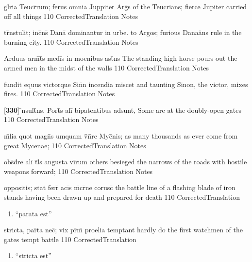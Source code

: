 \latline
  {gl\={}ria Teucr\={}rum; ferus omnia Juppiter Arg\={}s}
  { of the Teucrians; fierce Jupiter carried off all things }
  {110}
  { CorrectedTranslation }
  { Notes }


\latline
  {tr\={}nstulit; inc\={}ns\={} Dana\={\macron {\i}} dominantur in urbe.}
  { to Argos; furious Dana\"ans rule in the burning city.  }
  {110}
  { CorrectedTranslation }
  { Notes }


\latline
  {Arduus arm\={}t\={}s medi\={\macron {\i}}s in moenibus ast\={}ns}
  { The standing high horse pours out the armed men in the midst of the walls }
  {110}
  { CorrectedTranslation }
  { Notes }


\latline
  {fundit equus victorque Sin\={}n incendia miscet}
  { and taunting Sinon, the victor, mixes fires.  }
  {110}
  { CorrectedTranslation }
  { Notes }


\latline
  {[\textbf{330}] \={\macron {\i}}nsult\={}ns.  Port\={\macron {\i}}s ali\={\macron {\i}} bipatentibus adsunt,}
  { Some are at the doubly-open gates }
  {110}
  { CorrectedTranslation }
  { Notes }


\latline
  {m\={\macron {\i}}lia quot magn\={\macron {\i}}s umquam v\={}n\={}re Myc\={}nis;}
  { as many thousands as ever come from great Mycenae; }
  {110}
  { CorrectedTranslation }
  { Notes }


\latline
  {obs\={}d\={}re ali\={\macron {\i}} t\={}l\={\macron {\i}}s angusta vi\={}rum}
  { others besieged the narrows of the roads with hostile weapons forward;  }
  {110}
  { CorrectedTranslation }
  { Notes }


\latline
  {oppositis; stat ferr\={\macron {\i}} aci\={}s m\={}cr\={}ne corusc\={}}
  { the battle line of a flashing blade of iron stands having been drawn up and prepared for death }
  {110}
  { CorrectedTranslation }
  { \begin{enumerate}
  	\item ``parata est''
  \end{enumerate} }


\latline
  {stricta, par\={}ta nec\={\macron {\i}}; vix pr\={\macron {\i}}m\={\macron {\i}} proelia temptant}
  { hardly do the first watchmen of the gates tempt battle }
  {110}
  { CorrectedTranslation }
  { \begin{enumerate}
  	\item ``stricta est''
  \end{enumerate} }


